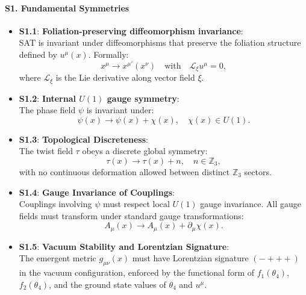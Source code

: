 \documentclass[12pt]{article}
\begin{document}
\paragraph{S1. Fundamental Symmetries}
\begin{itemize}
    \item \textbf{S1.1}: \textbf{Foliation-preserving diffeomorphism invariance}: \\
    SAT is invariant under diffeomorphisms that preserve the foliation structure defined by \( u^\mu(x) \). Formally:
    \[
    x^\mu \to x^{\mu'}(x^\nu) \quad \text{with} \quad \mathcal{L}_\xi u^\mu = 0,
    \]
    where \( \mathcal{L}_\xi \) is the Lie derivative along vector field \( \xi \).

    \item \textbf{S1.2}: \textbf{Internal \( U(1) \) gauge symmetry}: \\
    The phase field \( \psi \) is invariant under:
    \[
    \psi(x) \to \psi(x) + \chi(x), \quad \chi(x) \in U(1).
    \]

    \item \textbf{S1.3}: \textbf{Topological Discreteness}: \\
    The twist field \( \tau \) obeys a discrete global symmetry:
    \[
    \tau(x) \to \tau(x) + n, \quad n \in \mathbb{Z}_3,
    \]
    with no continuous deformation allowed between distinct \( \mathbb{Z}_3 \) sectors.

    \item \textbf{S1.4}: \textbf{Gauge Invariance of Couplings}: \\
    Couplings involving \( \psi \) must respect local \( U(1) \) gauge invariance. All gauge fields must transform under standard gauge transformations:
    \[
    A_\mu(x) \to A_\mu(x) + \partial_\mu \chi(x).
    \]

    \item \textbf{S1.5}: \textbf{Vacuum Stability and Lorentzian Signature}: \\
    The emergent metric \( g_{\mu\nu}(x) \) must have Lorentzian signature \((-+++)\) in the vacuum configuration, enforced by the functional form of \( f_1(\theta_4) \), \( f_2(\theta_4) \), and the ground state values of \( \theta_4 \) and \( u^\mu \).
\end{itemize}
\end{document}
